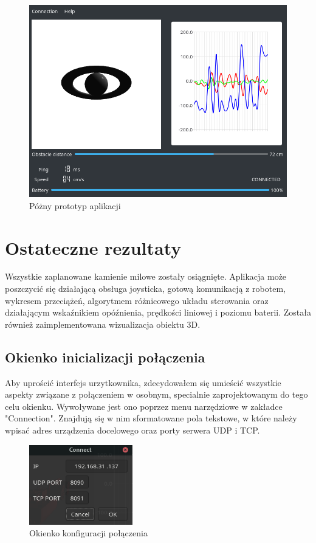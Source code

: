 \documentclass[12pt,a4paper,polish]{article}
\begin{document}
  \begin{figure}[ht]
    \centering
    \includegraphics[width=1\textwidth]{img/app.png}
    \caption{Póżny prototyp aplikacji}
    \label{fig:interfejs}
  \end{figure}
  
  \section{Ostateczne rezultaty}
  Wszystkie zaplanowane kamienie milowe zostały osiągnięte. Aplikacja może 
  poszczycić się działającą obsługa joysticka, gotową komunikacją z robotem,
  wykresem przeciążeń, algorytmem różnicowego układu sterowania oraz działającym
  wskaźnikiem opóźnienia, prędkości liniowej i poziomu baterii. 
  Została również zaimplementowana wizualizacja obiektu 3D. 


  \subsection{Okienko inicializacji połączenia}
  Aby uprościć interfejs urzytkownika, zdecydowałem się umieścić wszystkie aspekty
  związane z połączeniem w osobnym, specialnie zaprojektowanym do tego celu okienku.
  Wywoływane jest ono poprzez menu narzędziowe w zakładce "Connection".
  Znajdują się w nim sformatowane pola tekstowe, w które należy wpisać adres urządzenia
  docelowego oraz porty serwera UDP i TCP.  

  \begin{figure}[h]
    \centering
    \includegraphics[width=0.4\textwidth]{img/final/conn.png}
    \caption{Okienko konfiguracji połączenia}
    \label{fig:conn}
  \end{figure}
\end{document}
